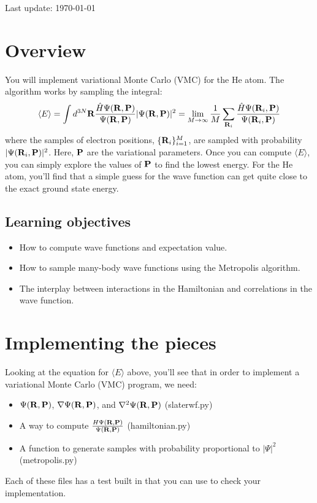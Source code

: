 \documentclass[12pt]{article}
\newcommand{\bR}{{\bf R}}
\newcommand{\bP}{{\bf P}}
\begin{document}
Last update: \today

\section{Overview} 

You will implement variational Monte Carlo (VMC) for the He atom. 
The algorithm works by sampling the integral:
\begin{equation}
  \label{eq:vmc}
  \langle
  E
  \rangle
  =
  \int
  d^{3N} \bR
  \frac{\hat{H} \Psi(\bR,\bP)}{\Psi(\bR,\bP)}
  |\Psi(\bR,\bP)|^2
  =
  \lim_{M\to \infty}
  \frac{1}{M}
  \sum_{\bR_i}
  \frac{\hat{H} \Psi(\bR_i,\bP)}{\Psi(\bR_i,\bP)}
\end{equation}
where the samples of electron positions, $\{\bR_i\}_{i=1}^M$, are sampled with probability $|\Psi(\bR_i,\bP)|^2$.
Here, $\bP$ are the variational parameters.
Once you can compute $\langle E \rangle$, you can simply explore the values of $\bP$ to find the lowest energy.
For the He atom, you'll find that a simple guess for the wave function can get quite close to the exact ground state energy.

\subsection{Learning objectives}
\begin{itemize}
\item How to compute wave functions and expectation value.
\item How to sample many-body wave functions using the Metropolis algorithm.
\item The interplay between interactions in the Hamiltonian and correlations in the wave function. 
\end{itemize}

\section{Implementing the pieces}

Looking at the equation for $\langle E \rangle$ above, you'll see that in order to implement a variational Monte Carlo (VMC) program, we need:
\begin{itemize}
	\item $\Psi(\bR,\bP)$, $\nabla \Psi(\bR,\bP)$, and $\nabla^2 \Psi(\bR,\bP)$ (slaterwf.py)
	\item A way to compute $\frac{H\Psi(\bR,\bP)}{\Psi(\bR,\bP)}$ (hamiltonian.py)
	\item A function to generate samples with probability proportional to $|\Psi|^2$ (metropolis.py)
\end{itemize}
Each of these files has a test built in that you can use to check your implementation.
\end{document}
